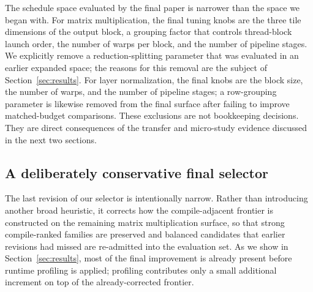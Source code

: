 The schedule space evaluated by the final paper is narrower than the space we began with. For matrix multiplication, the final tuning knobs are the three tile dimensions of the output block, a grouping factor that controls thread-block launch order, the number of warps per block, and the number of pipeline stages. We explicitly remove a reduction-splitting parameter that was evaluated in an earlier expanded space; the reasons for this removal are the subject of Section~\ref{sec:results}. For layer normalization, the final knobs are the block size, the number of warps, and the number of pipeline stages; a row-grouping parameter is likewise removed from the final surface after failing to improve matched-budget comparisons. These exclusions are not bookkeeping decisions. They are direct consequences of the transfer and micro-study evidence discussed in the next two sections.

\subsection{A deliberately conservative final selector}

The last revision of our selector is intentionally narrow. Rather than introducing another broad heuristic, it corrects how the compile-adjacent frontier is constructed on the remaining matrix multiplication surface, so that strong compile-ranked families are preserved and balanced candidates that earlier revisions had missed are re-admitted into the evaluation set. As we show in Section~\ref{sec:results}, most of the final improvement is already present before runtime profiling is applied; profiling contributes only a small additional increment on top of the already-corrected frontier.
